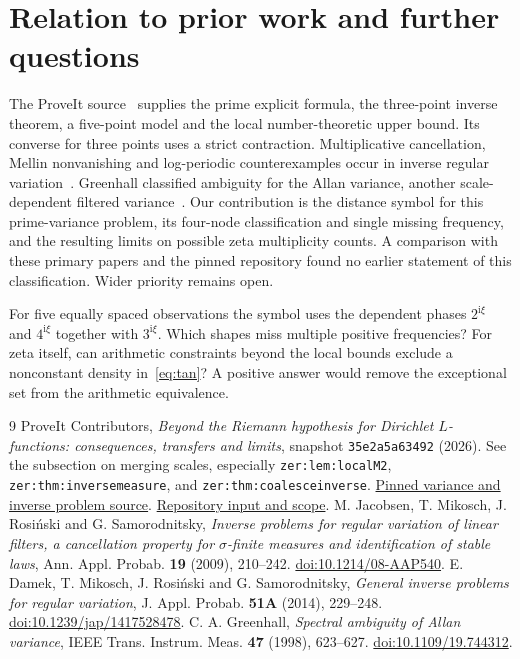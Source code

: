 \documentclass[11pt,letterpaper]{article}
\newcommand{\ii}{\mathrm i}
\begin{document}
\section*{Relation to prior work and further questions}
The ProveIt source~\cite{ProveIt} supplies the prime explicit formula, the three-point inverse theorem, a five-point model and the local number-theoretic upper bound. Its converse for three points uses a strict contraction. Multiplicative cancellation, Mellin nonvanishing and log-periodic counterexamples occur in inverse regular variation~\cite{JMRS,DMRS}. Greenhall classified ambiguity for the Allan variance, another scale-dependent filtered variance~\cite{Greenhall}. Our contribution is the distance symbol for this prime-variance problem, its four-node classification and single missing frequency, and the resulting limits on possible zeta multiplicity counts. A comparison with these primary papers and the pinned repository found no earlier statement of this classification. Wider priority remains open.

For five equally spaced observations the symbol uses the dependent phases $2^{\ii\xi}$ and $4^{\ii\xi}$ together with $3^{\ii\xi}$. Which shapes miss multiple positive frequencies? For zeta itself, can arithmetic constraints beyond the local bounds exclude a nonconstant density in~\eqref{eq:tan}? A positive answer would remove the exceptional set from the arithmetic equivalence.

\begin{thebibliography}{9}
 ProveIt Contributors, \emph{Beyond the Riemann hypothesis for Dirichlet $L$-functions: consequences, transfers and limits}, snapshot \texttt{35e2a5a63492} (2026). See the subsection on merging scales, especially \texttt{zer:lem:localM2}, \texttt{zer:thm:inversemeasure}, and \texttt{zer:thm:coalesceinverse}. \href{https://github.com/VladimirReshetnikov/ProveIt/blob/35e2a5a634924e57ac6b77bd73a28570dd1a362b/Analysis/GeneralizedRiemannHypothesis/Article/sections/zer.tex}{Pinned variance and inverse problem source}. \href{https://github.com/VladimirReshetnikov/ProveIt/blob/35e2a5a634924e57ac6b77bd73a28570dd1a362b/Analysis/GeneralizedRiemannHypothesis/Article/sections/src.tex}{Repository input and scope}.
 M. Jacobsen, T. Mikosch, J. Rosi\'nski and G. Samorodnitsky, \emph{Inverse problems for regular variation of linear filters, a cancellation property for $\sigma$-finite measures and identification of stable laws}, Ann. Appl. Probab. \textbf{19} (2009), 210--242. \href{https://doi.org/10.1214/08-AAP540}{doi:10.1214/08-AAP540}.
 E. Damek, T. Mikosch, J. Rosi\'nski and G. Samorodnitsky, \emph{General inverse problems for regular variation}, J. Appl. Probab. \textbf{51A} (2014), 229--248. \href{https://doi.org/10.1239/jap/1417528478}{doi:10.1239/jap/1417528478}.
 C. A. Greenhall, \emph{Spectral ambiguity of Allan variance}, IEEE Trans. Instrum. Meas. \textbf{47} (1998), 623--627. \href{https://doi.org/10.1109/19.744312}{doi:10.1109/19.744312}.
\end{thebibliography}
\end{document}
